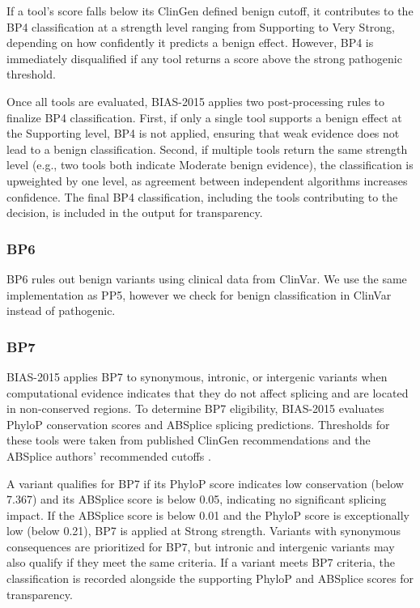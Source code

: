 \documentclass[unnumsec,webpdf,contemporary,large]{oup-authoring-template}
\theoremstyle{thmstyleone}
\theoremstyle{thmstyletwo}
\theoremstyle{thmstylethree}
\begin{document}
If a tool’s score falls below its ClinGen defined benign cutoff, it contributes to the BP4 classification at a strength level ranging from Supporting to Very Strong, depending on how confidently it predicts a benign effect. However, BP4 is immediately disqualified if any tool returns a score above the strong pathogenic threshold.

Once all tools are evaluated, BIAS-2015 applies two post-processing rules to finalize BP4 classification. First, if only a single tool supports a benign effect at the Supporting level, BP4 is not applied, ensuring that weak evidence does not lead to a benign classification. Second, if multiple tools return the same strength level (e.g., two tools both indicate Moderate benign evidence), the classification is upweighted by one level, as agreement between independent algorithms increases confidence. The final BP4 classification, including the tools contributing to the decision, is included in the output for transparency.

\subsubsection{BP6}
BP6 rules out benign variants using clinical data from ClinVar. We use the same implementation as PP5, however we check for benign classification in ClinVar instead of pathogenic. 

\subsubsection{BP7}
BIAS-2015 applies BP7 to synonymous, intronic, or intergenic variants when computational evidence indicates that they do not affect splicing and are located in non-conserved regions. To determine BP7 eligibility, BIAS-2015 evaluates PhyloP conservation scores and ABSplice splicing predictions. Thresholds for these tools were taken from published ClinGen recommendations and the ABSplice authors' recommended cutoffs \cite{pejaver2022pp3bp4}.

A variant qualifies for BP7 if its PhyloP score indicates low conservation (below 7.367) and its ABSplice score is below 0.05, indicating no significant splicing impact. If the ABSplice score is below 0.01 and the PhyloP score is exceptionally low (below 0.21), BP7 is applied at Strong strength. Variants with synonymous consequences are prioritized for BP7, but intronic and intergenic variants may also qualify if they meet the same criteria. If a variant meets BP7 criteria, the classification is recorded alongside the supporting PhyloP and ABSplice scores for transparency.
\end{document}
